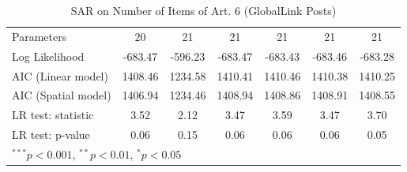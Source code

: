 \begin{table}[!h]
\begin{center}
\begin{tabular}{l c c c c c c }
Parameters              & 20           & 21            & 21           & 21           & 21           & 21           \\
Log Likelihood          & -683.47      & -596.23       & -683.47      & -683.43      & -683.46      & -683.28      \\
AIC (Linear model)      & 1408.46      & 1234.58       & 1410.41      & 1410.46      & 1410.38      & 1410.25      \\
AIC (Spatial model)     & 1406.94      & 1234.46       & 1408.94      & 1408.86      & 1408.91      & 1408.55      \\
LR test: statistic      & 3.52         & 2.12          & 3.47         & 3.59         & 3.47         & 3.70         \\
LR test: p-value        & 0.06         & 0.15          & 0.06         & 0.06         & 0.06         & 0.05         \\
\bottomrule
\multicolumn{7}{l}{\scriptsize{$^{***}p<0.001$, $^{**}p<0.01$, $^*p<0.05$}}
\end{tabular}
\caption{SAR on Number of Items of Art. 6 (GlobalLink Posts)}
\label{table:coefficients}
\end{center}
\end{table}
